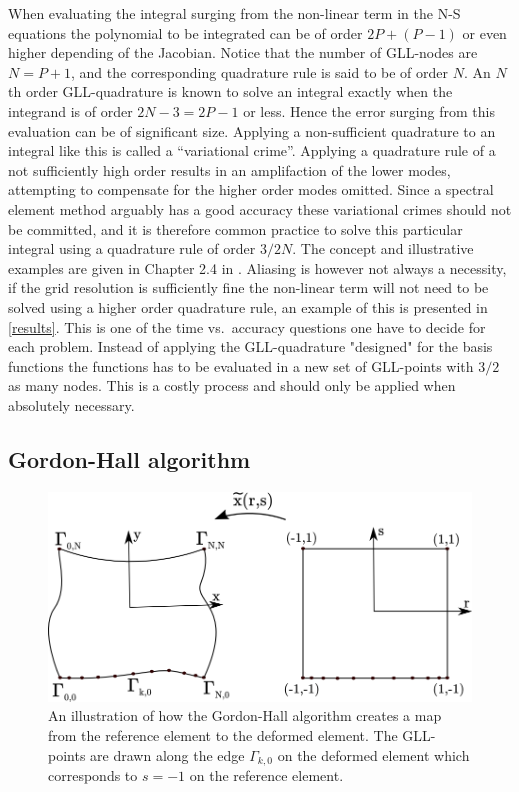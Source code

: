 When evaluating the integral surging from the non-linear term in the N-S equations 
the polynomial to be integrated can be of order $2P+(P-1)$ or even higher depending
of the Jacobian. Notice that the number of GLL-nodes are $N=P+1$, and the corresponding
quadrature rule is said to be of order $N$. An $N$th order GLL-quadrature is known to 
solve an integral exactly when the integrand is of order $2N-3=2P-1$ or less.
Hence the error surging from this evaluation can be of significant size.
Applying a non-sufficient quadrature to an integral like this is called a ``variational
crime''. Applying a quadrature rule of a not sufficiently high order results in an 
amplifaction of the lower modes, attempting to compensate for the higher order modes omitted. 
Since a spectral element method arguably has a good accuracy these variational crimes should 
not be committed, and it is therefore common practice to solve this particular integral using a
quadrature rule of order $3/2N$. The concept and illustrative examples are given in Chapter 2.4 in 
\cite{Karniadakis}. Aliasing is however not always a necessity, if the grid resolution is 
sufficiently fine the non-linear term will not need to be solved using a higher order quadrature rule, 
an example of this is presented in \cref{results}.
This is one of the time vs.\ accuracy questions one have to decide for each problem. 
Instead of applying the GLL-quadrature "designed" for the basis functions the functions
has to be evaluated in a new set of GLL-points with $3/2$ as many nodes. This is a costly 
process and should only be applied when absolutely necessary. 


\subsection{Gordon-Hall algorithm} \label{GH}

%
\begin{figure}[h]
	\centering
	\includegraphics[width=1.0\textwidth]{Figures/GordonHall5.png}
	\caption{An illustration of how the Gordon-Hall algorithm creates a map from the 
    reference element to the deformed element. The GLL-points are drawn along the edge
    $\Gamma_{k,0}$ on the deformed element which corresponds to $s=-1$ on the reference
    element.}
	\label{fig:GH}
\end{figure}
%

